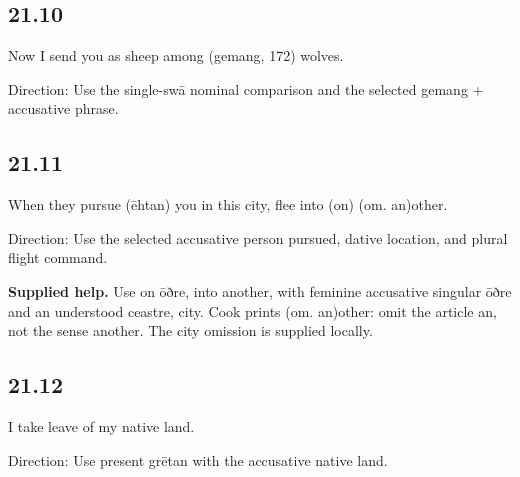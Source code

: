 \subsection*{21.10}

\par\begin{minipage}{\linewidth}\raggedright
Now I send you as sheep among (gemang, 172) wolves.

Direction: Use the single-swā nominal comparison and the selected gemang + accusative phrase.

\end{minipage}\par\addvspace{4pt}

\subsection*{21.11}

\par\begin{minipage}{\linewidth}\raggedright
When they pursue (ēhtan) you in this city, flee into (on) (om. an)other.

Direction: Use the selected accusative person pursued, dative location, and plural flight command.

\end{minipage}\par\addvspace{4pt}

\textbf{Supplied help.} Use on ōðre, into another, with feminine accusative singular ōðre and an understood ceastre, city. Cook prints (om. an)other: omit the article an, not the sense another. The city omission is supplied locally.

\subsection*{21.12}

\par\begin{minipage}{\linewidth}\raggedright
I take leave of my native land.

Direction: Use present grētan with the accusative native land.

\end{minipage}\par\addvspace{4pt}

